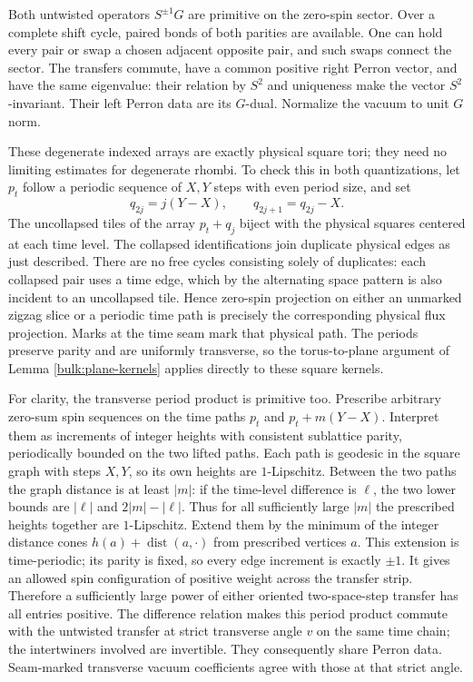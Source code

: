 Both untwisted operators $S^{\pm1}G$ are primitive on the
zero-spin sector. Over a complete shift cycle, paired bonds of
both parities are available. One can hold every pair or swap a
chosen adjacent opposite pair, and such swaps connect the sector.
The transfers commute, have a common positive right Perron
vector, and have the same eigenvalue: their relation by $S^2$
and uniqueness make the vector $S^2$-invariant. Their left
Perron data are its $G$-dual. Normalize the vacuum to unit
$G$ norm.

These degenerate indexed arrays are exactly physical square
tori; they need no limiting estimates for degenerate rhombi.
To check this in both quantizations, let $p_t$ follow a periodic
sequence of $X,Y$ steps with even period size, and set
\[
 q_{2j}=j(Y-X),\qquad q_{2j+1}=q_{2j}-X.
\]
The uncollapsed tiles of the array $p_t+q_j$ biject with the
physical squares centered at each time level. The collapsed
identifications join duplicate physical edges as just described.
There are no free cycles consisting solely of duplicates:
each collapsed pair uses a time edge, which by the alternating
space pattern is also incident to an uncollapsed tile. Hence
zero-spin projection on either an unmarked zigzag slice or a
periodic time path is precisely the corresponding physical flux
projection. Marks at the time seam mark that physical path.
The periods preserve parity and are uniformly transverse, so
the torus-to-plane argument of Lemma \ref{bulk:plane-kernels}
applies directly to these square kernels.

For clarity, the transverse period product is primitive too.
Prescribe arbitrary zero-sum spin sequences on the time paths
$p_t$ and $p_t+m(Y-X)$. Interpret them as increments of integer
heights with consistent sublattice parity, periodically bounded
on the two lifted paths. Each path is geodesic in the square
graph with steps $X,Y$, so its own heights are $1$-Lipschitz.
Between the two paths the graph distance is at least $|m|$:
if the time-level difference is $\ell$, the two lower bounds
are $|\ell|$ and $2|m|-|\ell|$. Thus for all sufficiently large
$|m|$ the prescribed heights together are $1$-Lipschitz.
Extend them by the minimum of the integer distance cones
$h(a)+\operatorname{dist}(a,\cdot)$ from prescribed vertices $a$.
This extension is time-periodic; its parity is fixed, so every
edge increment is exactly $\pm1$. It gives an allowed spin
configuration of positive weight across the transfer strip.
Therefore a sufficiently large power of either oriented
two-space-step transfer has all entries positive. The
difference relation makes this period product commute with
the untwisted transfer at strict transverse angle $v$ on the
same time chain; the intertwiners involved are invertible.
They consequently share Perron data. Seam-marked transverse
vacuum coefficients agree with those at that strict angle.

